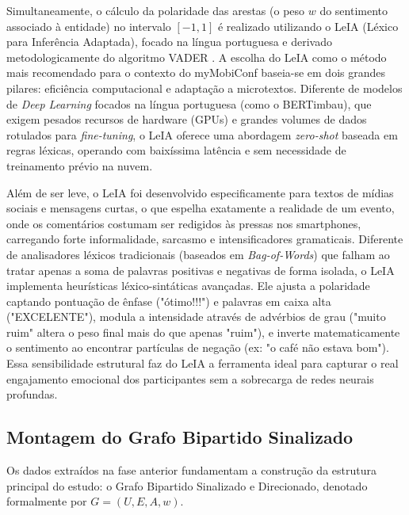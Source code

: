 \documentclass[sigconf]{webmedia}
\begin{document}
Simultaneamente, o cálculo da polaridade das arestas (o peso $w$ do sentimento associado à entidade) no intervalo $[-1, 1]$ é realizado utilizando o LeIA (Léxico para Inferência Adaptada), focado na língua portuguesa e derivado metodologicamente do algoritmo VADER \cite{vader}. A escolha do LeIA como o método mais recomendado para o contexto do myMobiConf baseia-se em dois grandes pilares: eficiência computacional e adaptação a microtextos. Diferente de modelos de \textit{Deep Learning} focados na língua portuguesa (como o BERTimbau), que exigem pesados recursos de hardware (GPUs) e grandes volumes de dados rotulados para \textit{fine-tuning}, o LeIA oferece uma abordagem \textit{zero-shot} baseada em regras léxicas, operando com baixíssima latência e sem necessidade de treinamento prévio na nuvem.

Além de ser leve, o LeIA foi desenvolvido especificamente para textos de mídias sociais e mensagens curtas, o que espelha exatamente a realidade de um evento, onde os comentários costumam ser redigidos às pressas nos smartphones, carregando forte informalidade, sarcasmo e intensificadores gramaticais. Diferente de analisadores léxicos tradicionais (baseados em \textit{Bag-of-Words}) que falham ao tratar apenas a soma de palavras positivas e negativas de forma isolada, o LeIA implementa heurísticas léxico-sintáticas avançadas. Ele ajusta a polaridade captando pontuação de ênfase ("ótimo!!!") e palavras em caixa alta ("EXCELENTE"), modula a intensidade através de advérbios de grau ("muito ruim" altera o peso final mais do que apenas "ruim"), e inverte matematicamente o sentimento ao encontrar partículas de negação (ex: "o café não estava bom"). Essa sensibilidade estrutural faz do LeIA a ferramenta ideal para capturar o real engajamento emocional dos participantes sem a sobrecarga de redes neurais profundas.

\subsection{Montagem do Grafo Bipartido Sinalizado}
Os dados extraídos na fase anterior fundamentam a construção da estrutura principal do estudo: o Grafo Bipartido Sinalizado e Direcionado, denotado formalmente por $G = (U, E, A, w)$. 
\end{document}
